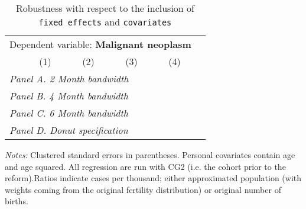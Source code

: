  \begin{table}[H] \begin{threeparttable} \centering \caption{Robustness with respect to the inclusion of \texttt{fixed effects} and \texttt{covariates}} {\def\sym#1{\ifmmode^{#1}\else\(^{#1}\)\fi} \begin{tabular}{l*{5}{c}} \toprule \multicolumn{5}{c}{Dependent variable: \textbf{Malignant neoplasm}} \\ \cmidrule(lr){2-5}
            &\multicolumn{1}{c}{(1)}&\multicolumn{1}{c}{(2)}&\multicolumn{1}{c}{(3)}&\multicolumn{1}{c}{(4)}\\
\midrule
 \multicolumn{5}{l}{\emph{Panel A. 2 Month bandwidth}} \\    \midrule\multicolumn{5}{l}{\emph{Panel B. 4 Month bandwidth}} \\    \midrule\multicolumn{5}{l}{\emph{Panel C. 6 Month bandwidth}} \\    \midrule\multicolumn{5}{l}{\emph{Panel D. Donut specification}} \\    \midrule  
\bottomrule \end{tabular} } \begin{tablenotes} \item \scriptsize \emph{Notes:} Clustered standard errors in parentheses. Personal covariates contain age and age squared. All regression are run with CG2 (i.e. the cohort prior to the reform).Ratios indicate cases per thousand; either approximated population (with weights coming from the original fertility distribution) or original number of births. \end{tablenotes} \end{threeparttable} \end{table} 
